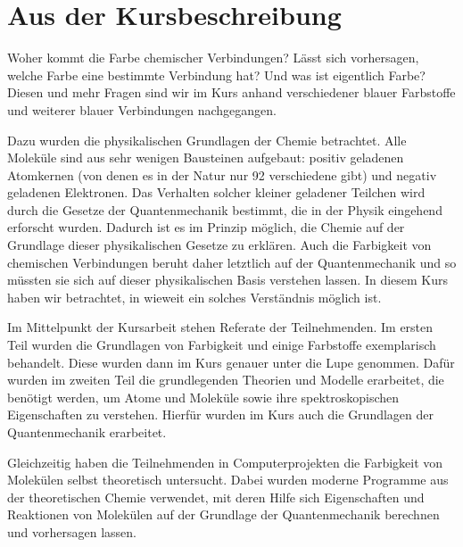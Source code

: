 \section{Aus der Kursbeschreibung}

Woher kommt die Farbe chemischer Verbindungen? Lässt sich vorhersagen,
welche Farbe eine bestimmte Verbindung hat? Und was ist eigentlich Farbe?
Diesen und mehr Fragen sind wir im Kurs anhand verschiedener blauer
Farbstoffe und weiterer blauer Verbindungen nachgegangen.

Dazu wurden die physikalischen Grundlagen der Chemie betrachtet.
Alle Moleküle sind aus sehr wenigen Bausteinen aufgebaut: positiv geladenen
Atomkernen (von denen es in der Natur nur 92 verschiedene gibt) und negativ
geladenen Elektronen. Das Verhalten solcher kleiner geladener Teilchen wird
durch die
Gesetze der Quantenmechanik bestimmt, die in der Physik eingehend erforscht
wurden. Dadurch ist es im Prinzip möglich, die Chemie auf der Grundlage dieser
physikalischen Gesetze zu erklären. Auch die Farbigkeit von chemischen
Verbindungen beruht daher
letztlich auf der Quantenmechanik und so müssten sie sich auf dieser
physikalischen Basis verstehen lassen. In diesem Kurs haben wir betrachtet,
in wieweit ein solches Verständnis möglich ist.

Im Mittelpunkt der Kursarbeit stehen Referate der Teilnehmenden. Im ersten Teil
wurden die Grundlagen von Farbigkeit und einige Farbstoffe exemplarisch
behandelt.
Diese wurden dann im Kurs genauer unter die Lupe genommen.
Dafür wurden im zweiten Teil die grundlegenden Theorien und Modelle erarbeitet,
die benötigt werden, um Atome und Moleküle sowie ihre spektroskopischen
Eigenschaften zu verstehen. Hierfür wurden im Kurs auch die Grundlagen der
Quantenmechanik erarbeitet.

Gleichzeitig haben die Teilnehmenden in Computerprojekten die Farbigkeit von
Molekülen selbst theoretisch untersucht. Dabei wurden moderne Programme aus
der theoretischen Chemie verwendet, mit deren Hilfe sich Eigenschaften und
Reaktionen von Molekülen auf der Grundlage der Quantenmechanik berechnen
und vorhersagen lassen.
